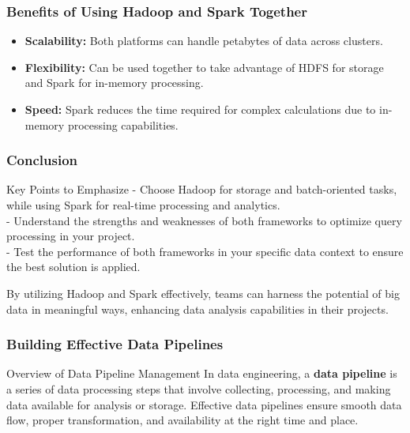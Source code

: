 \documentclass[aspectratio=169]{beamer}
\begin{document}
\begin{frame}[fragile]
    \frametitle{Benefits of Using Hadoop and Spark Together}

    \begin{itemize}
        \item \textbf{Scalability:} Both platforms can handle petabytes of data across clusters.
        \item \textbf{Flexibility:} Can be used together to take advantage of HDFS for storage and Spark for in-memory processing.
        \item \textbf{Speed:} Spark reduces the time required for complex calculations due to in-memory processing capabilities.
    \end{itemize}
\end{frame}

\begin{frame}[fragile]
    \frametitle{Conclusion}
    
    \begin{block}{Key Points to Emphasize}
        - Choose Hadoop for storage and batch-oriented tasks, while using Spark for real-time processing and analytics.\\
        - Understand the strengths and weaknesses of both frameworks to optimize query processing in your project.\\
        - Test the performance of both frameworks in your specific data context to ensure the best solution is applied.
    \end{block}
    
    By utilizing Hadoop and Spark effectively, teams can harness the potential of big data in meaningful ways, enhancing data analysis capabilities in their projects.
\end{frame}

\begin{frame}[fragile]
    \frametitle{Building Effective Data Pipelines}
    \begin{block}{Overview of Data Pipeline Management}
        In data engineering, a \textbf{data pipeline} is a series of data processing steps that involve collecting, processing, and making data available for analysis or storage. Effective data pipelines ensure smooth data flow, proper transformation, and availability at the right time and place.
    \end{block}
\end{frame}
\end{document}
